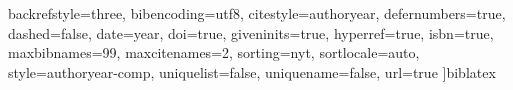 	backrefstyle=three,		%
	bibencoding=utf8,		%
	citestyle=authoryear,	%
	defernumbers=true,		%
	dashed=false,			%
	date=year,				%
	doi=true,				%
	giveninits=true,		%
	hyperref=true,			%
	isbn=true,				%
	maxbibnames=99,			%
	maxcitenames=2,			%
	sorting=nyt,			%
	sortlocale=auto,		%
	style=authoryear-comp,		%
	uniquelist=false,		%
	uniquename=false,		%
	url=true				%
]{biblatex}
\usepackage[
	autostyle=true,			%
	strict=true				%
]{csquotes}					%
\usepackage{acro}			%
\usepackage{imakeidx}		%
\usepackage[
	intoc,         			%
	nomentbl,				%
	noprefix,				%
]{nomencl}					%
\usepackage{listings}		%
\newcommand{\KtwoP}{K\textsubscript{2P}}
\usepackage{xurl}			%






